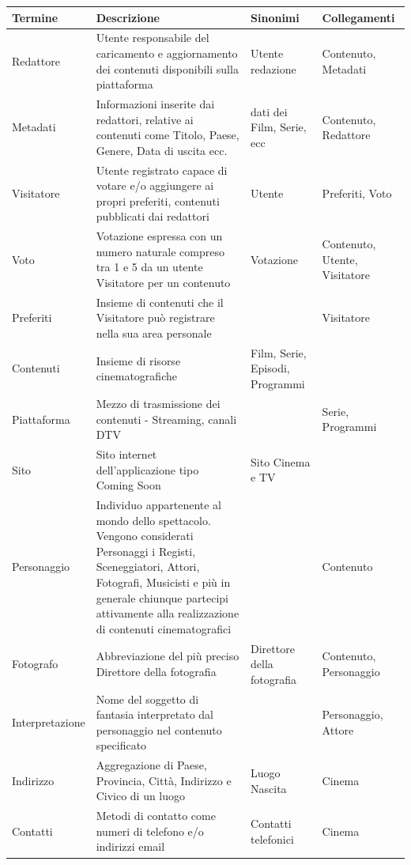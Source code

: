 \documentclass[a4paper]{article}
\begin{document}
\begin{tabular}{ L{0.17\textwidth} L{0.43\textwidth} L{0.15\textwidth} L{0.20\textwidth} }
\\
\hline
\textbf{Termine} & \textbf{Descrizione} & \textbf{Sinonimi} & \textbf{Collegamenti} \\
\hline
\hline

 Redattore & Utente responsabile del caricamento e aggiornamento dei contenuti disponibili sulla piattaforma & Utente redazione & Contenuto, Metadati \\ 
 
\hline
Metadati & Informazioni inserite dai redattori, relative ai contenuti come Titolo, Paese, Genere, Data di uscita ecc. & dati dei Film, Serie, ecc & Contenuto, Redattore \\

\hline
 Visitatore & Utente registrato capace di votare e/o aggiungere ai propri preferiti, contenuti pubblicati dai redattori & Utente & Preferiti, Voto \\ 
 
\hline
 Voto & Votazione espressa con un numero naturale compreso tra 1 e 5 da un utente Visitatore per un contenuto & Votazione & Contenuto, Utente, Visitatore \\
 
\hline
 Preferiti & Insieme di contenuti che il Visitatore può registrare nella sua area personale &  & Visitatore \\
 
\hline
 Contenuti & Insieme di risorse cinematografiche & Film, Serie, Episodi, Programmi &  \\  
 
\hline
 Piattaforma & Mezzo di trasmissione dei contenuti - Streaming, canali DTV &  & Serie, Programmi \\
 
\hline
 Sito & Sito internet dell'applicazione tipo Coming Soon & Sito Cinema e TV &  \\
 
\hline
 Personaggio & Individuo appartenente al mondo dello spettacolo. Vengono considerati Personaggi i Registi,
 Sceneggiatori, Attori, Fotografi, Musicisti e più in generale chiunque partecipi attivamente alla realizzazione di 
 contenuti cinematografici &  & Contenuto \\
 
 \hline
 Fotografo & Abbreviazione del più preciso Direttore della fotografia & Direttore della fotografia & Contenuto, Personaggio \\

\hline
 Interpretazione & Nome del soggetto di fantasia interpretato dal personaggio nel contenuto specificato & & Personaggio, Attore \\ 
 
\hline
 Indirizzo & Aggregazione di Paese, Provincia, Città, Indirizzo e Civico di un luogo & Luogo Nascita & Cinema \\

 \hline
 Contatti & Metodi di contatto come numeri di telefono e/o indirizzi email & Contatti telefonici & Cinema \\
\end{tabular}
\end{document}
